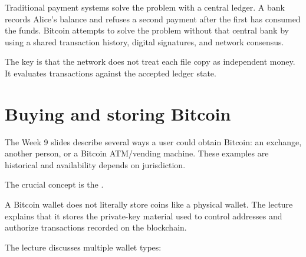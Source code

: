 Traditional payment systems solve the problem with a central ledger. A bank records Alice's balance and refuses a second payment after the first has consumed the funds. Bitcoin attempts to solve the problem without that central bank by using a shared transaction history, digital signatures, and network consensus.

\begin{mlfigure}
\end{mlfigure}

The key is that the network does not treat each file copy as independent money. It evaluates transactions against the accepted ledger state.

\section{Buying and storing Bitcoin}

The Week 9 slides describe several ways a user could obtain Bitcoin: an exchange, another person, or a Bitcoin ATM/vending machine. These examples are historical and availability depends on jurisdiction.

The crucial concept is the .

\begin{keyidea}
A Bitcoin wallet does not literally store coins like a physical wallet. The lecture explains that it stores the private-key material used to control addresses and authorize transactions recorded on the blockchain.
\end{keyidea}

The lecture discusses multiple wallet types:

